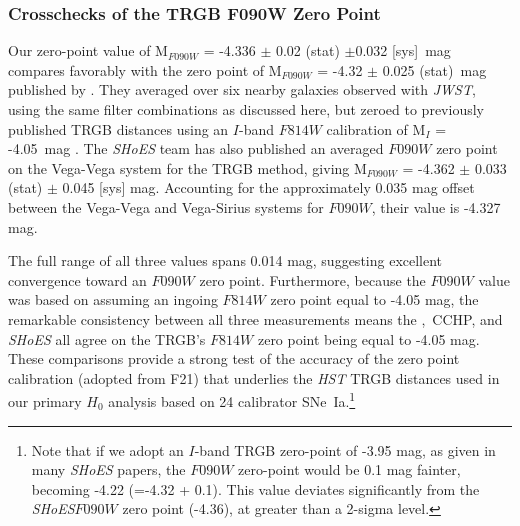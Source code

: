 \documentclass[12pt,modern]{aastex631}
\newcommand{\cchp}{\,CCHP\xspace}
\newcommand{\ho}{$H_{0}$\xspace}
\newcommand{\hst}{\emph{HST}\xspace}
\newcommand{\jwst}{\emph{JWST}\xspace}
\newcommand{\sne}{SNe~Ia\xspace}
\newcommand{\shoes}{\emph{SHoES}\xspace}
\begin{document}

\medskip\medskip\medskip\medskip\medskip\medskip\medskip\medskip\medskip

\subsubsection{Crosschecks of the TRGB F090W Zero Point}

Our zero-point value of M$_{F090W}$ =  -4.336 $\pm$ 0.02 (stat) $\pm$0.032 [sys]~mag compares favorably with the zero point of M$_{F090W}$ =  -4.32 $\pm$ 0.025 (stat)~mag published by \citet{newman_2024b}. They  averaged over six nearby galaxies observed with \jwst, using the same filter combinations as discussed here, but zeroed to previously published TRGB distances using an $I$-band $F814W$ calibration of M$_I$ =  -4.05~mag \citep{freedman_2021}.  The \shoes team \citep{anand_2024b} has also published an averaged $F090W$ zero point on the Vega-Vega system for the TRGB method, 
giving M$_{F090W}$ = -4.362 $\pm$ 0.033 (stat) $\pm$ 0.045 [sys] mag. Accounting for the approximately 0.035 mag offset between the Vega-Vega and Vega-Sirius systems for $F090W$, their value is -4.327 mag. 

The full range of all three values spans 0.014 mag, suggesting excellent convergence toward an $F090W$ zero point. Furthermore, because the \citet{newman_2024b} $F090W$ value was based on assuming an ingoing $F814W$ zero point equal to -4.05 mag, the remarkable consistency between all three measurements means the \citeauthor{newman_2024b}, \cchp, and \shoes all agree on the TRGB’s $F814W$ zero point being equal to -4.05 mag. These comparisons provide a strong test of the accuracy of the zero point calibration (adopted from F21) that underlies the \hst TRGB distances used in our primary \ho analysis  based on 24 calibrator \sne.\footnote{ Note that if we adopt an $I$-band TRGB zero-point of -3.95 mag, as given in many \shoes papers, the \citeauthor{newman_2024b} $F090W$ zero-point would be 0.1 mag fainter, becoming -4.22 (=-4.32 + 0.1). This value  deviates significantly from the \shoes $F090W$ zero point (-4.36), at greater than a 2-sigma level.}
\end{document}
